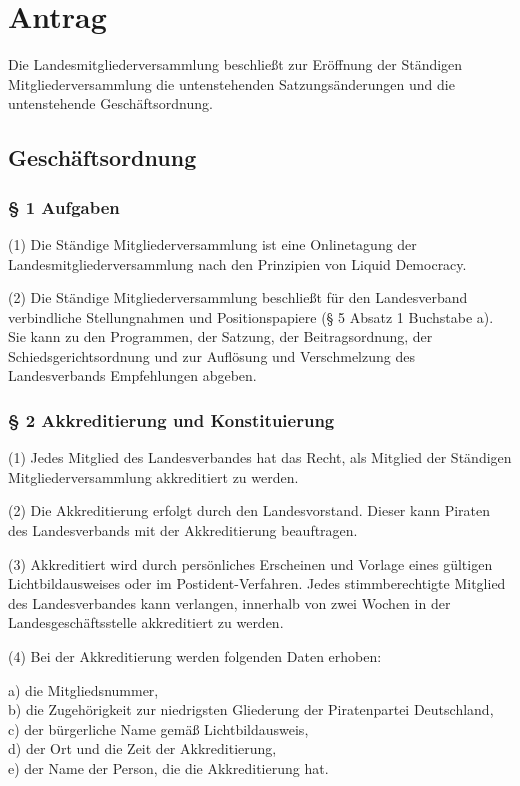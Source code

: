 \section{Antrag}

Die Landesmitgliederversammlung beschließt zur Eröffnung der Ständigen Mitgliederversammlung die untenstehenden Satzungsänderungen und die untenstehende Geschäftsordnung.

\subsection{Geschäftsordnung}

\subsubsection{§ 1 Aufgaben}

(1) Die Ständige Mitgliederversammlung ist eine Onlinetagung der Landesmitgliederversammlung nach den Prinzipien von Liquid Democracy.

(2) Die Ständige Mitgliederversammlung beschließt für den Landesverband verbindliche Stellungnahmen und Positionspapiere (§ 5 Absatz 1 Buchstabe a). Sie kann zu den Programmen, der Satzung, der Beitragsordnung, der Schiedsgerichtsordnung und zur Auflösung und Verschmelzung des Landesverbands Empfehlungen abgeben.

\subsubsection{§ 2 Akkreditierung und Konstituierung}

(1) Jedes Mitglied des Landesverbandes hat das Recht, als Mitglied der Ständigen Mitgliederversammlung akkreditiert zu werden.

(2) Die Akkreditierung erfolgt durch den Landesvorstand. Dieser kann Piraten des Landesverbands mit der Akkreditierung beauftragen.

(3) Akkreditiert wird durch persönliches Erscheinen und Vorlage eines gültigen Lichtbildausweises oder im Postident-Verfahren. Jedes stimmberechtigte Mitglied des Landesverbandes kann verlangen, innerhalb von zwei Wochen in der Landesgeschäftsstelle akkreditiert zu werden.

(4) Bei der Akkreditierung werden folgenden Daten erhoben:

a) die Mitgliedsnummer,\\b) die Zugehörigkeit zur niedrigsten Gliederung der Piratenpartei Deutschland,\\c) der bürgerliche Name gemäß Lichtbildausweis,\\d) der Ort und die Zeit der Akkreditierung,\\e) der Name der Person, die die Akkreditierung hat.

